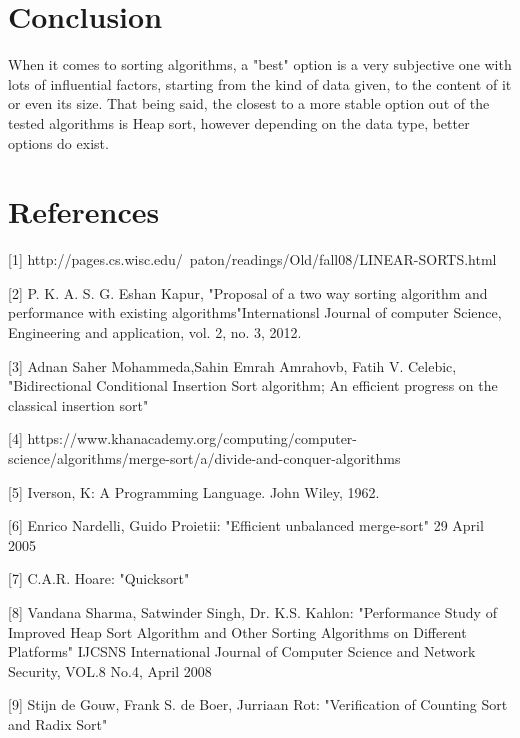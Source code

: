 \documentclass{article}
\begin{document}
\pagebreak
\section{Conclusion}
When it comes to sorting algorithms, a "best" option is a very subjective one with lots of influential factors, starting from the kind of data given, to the content of it or even its size. That being said, the closest to a more stable option out of the tested algorithms is Heap sort, however depending on the data type, better options do exist.

\section{References}
[1] http://pages.cs.wisc.edu/~paton/readings/Old/fall08/LINEAR-SORTS.html


[2] P. K. A. S. G. Eshan Kapur, "Proposal of a two way sorting algorithm and performance with existing algorithms"Internationsl Journal of computer Science, Engineering and application, vol. 2, no. 3, 2012.


[3] Adnan Saher Mohammeda,Sahin Emrah Amrahovb, Fatih V. Celebic, "Bidirectional Conditional Insertion Sort algorithm; An efficient progress on the classical insertion sort"


[4] https://www.khanacademy.org/computing/computer-science/algorithms/merge-sort/a/divide-and-conquer-algorithms


[5] Iverson, K: A Programming Language. John Wiley, 1962.


[6] Enrico Nardelli, Guido Proietii: "Efficient unbalanced merge-sort" 29 April 2005


[7] C.A.R. Hoare: "Quicksort"


[8] Vandana Sharma, Satwinder Singh, Dr. K.S. Kahlon: "Performance Study of Improved Heap Sort Algorithm and
Other Sorting Algorithms on Different Platforms" IJCSNS International Journal of Computer Science and Network Security, VOL.8 No.4, April 2008


[9] Stijn de Gouw, Frank S. de Boer, Jurriaan Rot: "Verification of Counting Sort and Radix Sort"
\end{document}
